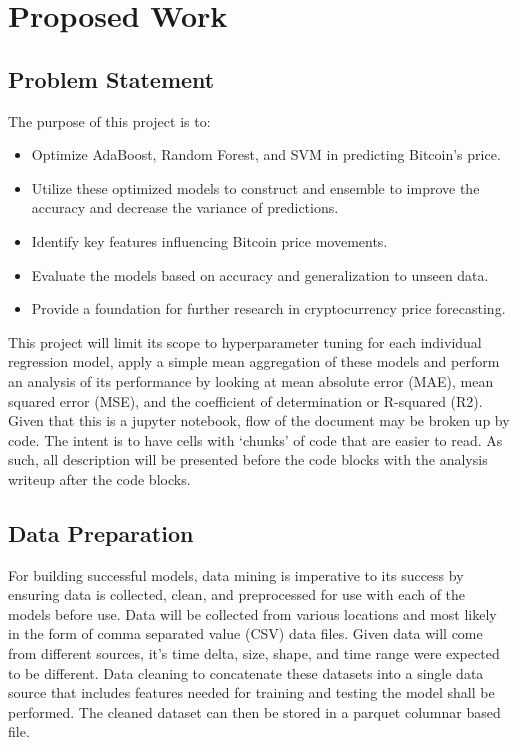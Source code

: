\section{Proposed Work}\label{sec:proposed_work}

\subsection{Problem Statement}\label{subsec:problem_Statement}

The purpose of this project is to:

\begin{itemize}
    \item Optimize AdaBoost, Random Forest, and SVM in predicting Bitcoin’s price.
    \item Utilize these optimized models to construct and ensemble to improve the accuracy and decrease the variance of predictions.
    \item Identify key features influencing Bitcoin price movements.
    \item Evaluate the models based on accuracy and generalization to unseen data.
    \item Provide a foundation for further research in cryptocurrency price forecasting.
\end{itemize}

This project will limit its scope to hyperparameter tuning for each individual regression model,
apply a simple mean aggregation of these models and perform an analysis of its performance by
looking at mean absolute error (MAE), mean squared error (MSE), and the coefficient of
determination or R-squared (R2). Given that this is a jupyter notebook, flow of the document may
be broken up by code. The intent is to have cells with `chunks' of code that are easier to read.
As such, all description will be presented before the code blocks with the analysis writeup after
the code blocks.

\subsection{Data Preparation}\label{sec:data_preparation}

For building successful models, data mining is imperative to its success by ensuring data is collected,
clean, and preprocessed for use with each of the models before use. Data will be collected from various
locations and most likely in the form of comma separated value (CSV) data files. Given data will come
from different sources, it's time delta, size, shape, and time range were expected to be different. 
Data cleaning to concatenate these datasets into a single data source that includes features needed for
training and testing the model shall be performed. The cleaned dataset can then be stored in a parquet
columnar based file. 

